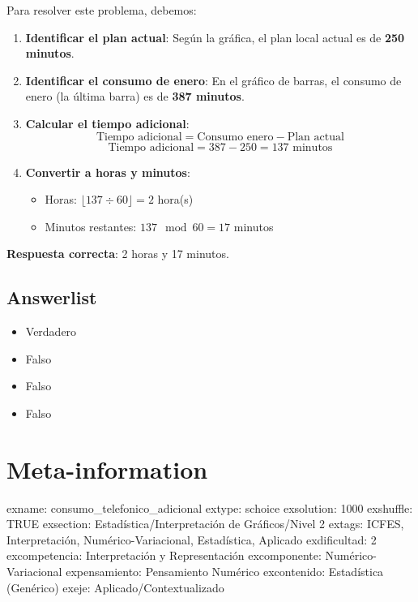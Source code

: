 \documentclass[
]{article}
\providecommand{\tightlist}{%
  \setlength{\itemsep}{0pt}\setlength{\parskip}{0pt}}
\begin{document}
Para resolver este problema, debemos:

\begin{enumerate}
\def\labelenumi{\arabic{enumi}.}
\item
  \textbf{Identificar el plan actual}: Según la gráfica, el plan local
  actual es de \textbf{250 minutos}.
\item
  \textbf{Identificar el consumo de enero}: En el gráfico de barras, el
  consumo de enero (la última barra) es de \textbf{387 minutos}.
\item
  \textbf{Calcular el tiempo adicional}:
  \[\text{Tiempo adicional} = \text{Consumo enero} - \text{Plan actual}\]
  \[\text{Tiempo adicional} = 387 - 250 = 137 \text{ minutos}\]
\item
  \textbf{Convertir a horas y minutos}:

  \begin{itemize}
  \tightlist
  \item
    Horas: \(\lfloor 137 \div 60 \rfloor = 2\) hora(s)
  \item
    Minutos restantes: \(137 \mod 60 = 17\) minutos
  \end{itemize}
\end{enumerate}

\textbf{Respuesta correcta}: 2 horas y 17 minutos.

\subsection{Answerlist}\label{answerlist-1}

\begin{itemize}
\tightlist
\item
  Verdadero
\item
  Falso
\item
  Falso
\item
  Falso
\end{itemize}

\section{Meta-information}\label{meta-information}

exname: consumo\_telefonico\_adicional extype: schoice exsolution: 1000
exshuffle: TRUE exsection: Estadística/Interpretación de Gráficos/Nivel
2 extags: ICFES, Interpretación, Numérico-Variacional, Estadística,
Aplicado exdificultad: 2 excompetencia: Interpretación y Representación
excomponente: Numérico-Variacional expensamiento: Pensamiento Numérico
excontenido: Estadística (Genérico) exeje: Aplicado/Contextualizado
\end{document}
